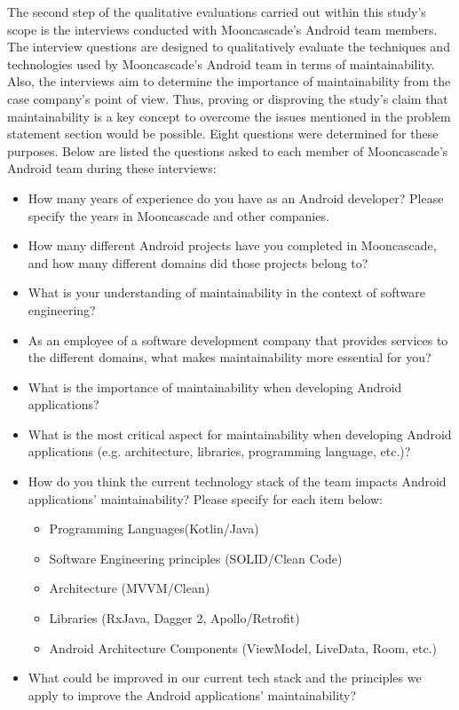 The second step of the qualitative evaluations carried out within this study’s scope is the interviews conducted with Mooncascade's Android team members.  The interview questions are designed to qualitatively evaluate the techniques and technologies used by Mooncascade's Android team in terms of maintainability. Also, the interviews aim to determine the importance of maintainability from the case company's point of view.  Thus, proving or disproving the study's claim that maintainability is a key concept to overcome the issues mentioned in the problem statement section would be possible. Eight questions were determined for these purposes. Below are listed the questions asked to each member of Mooncascade's Android team during these interviews:
\begin{itemize}
    \item How many years of experience do you have as an Android developer? Please specify the years in Mooncascade and other companies.
    \item How many different Android projects have you completed in Mooncascade, and how many different domains did those projects belong to?
    \item What is your understanding of maintainability in the context of software engineering?
    \item As an employee of a software development company that provides services to the different domains, what makes maintainability more essential for you?
    \item What is the importance of maintainability when developing Android applications?
    \item What is the most critical aspect for maintainability when developing Android applications (e.g. architecture, libraries, programming language, etc.)?
    \item How do you think the current technology stack of the team impacts Android applications’ maintainability? Please specify for each item below:
    \begin{itemize}
        \item Programming Languages(Kotlin/Java)
        \item Software Engineering principles (SOLID/Clean Code)
        \item Architecture (MVVM/Clean)
        \item Libraries (RxJava, Dagger 2, Apollo/Retrofit)
        \item Android Architecture Components (ViewModel, LiveData, Room, etc.)
    \end{itemize}
    \item What could be improved in our current tech stack and the principles we apply to improve the Android applications’ maintainability?
\end{itemize}

